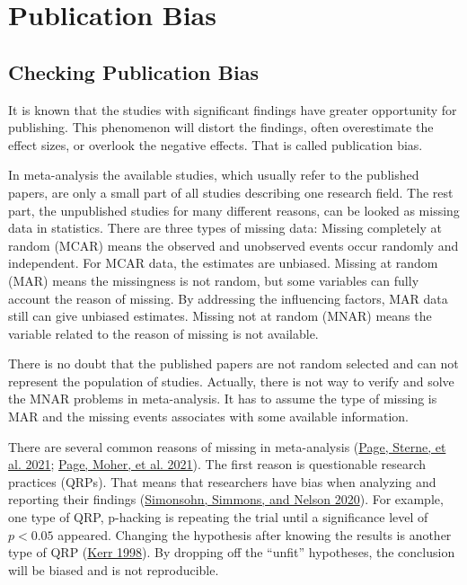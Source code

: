 \documentclass[
  11pt,
  openany]{memoir}
\begin{document}
\hypertarget{publication-bias}{%
\section{Publication Bias}\label{publication-bias}}

\hypertarget{checking-publication-bias}{%
\subsection{Checking Publication Bias}\label{checking-publication-bias}}

It is known that the studies with significant findings have greater opportunity for publishing.
This phenomenon will distort the findings, often overestimate the effect sizes, or overlook the negative effects.
That is called publication bias.

In meta-analysis the available studies, which usually refer to the published papers, are only a small part of all studies describing one research field.
The rest part, the unpublished studies for many different reasons, can be looked as missing data in statistics. There are three types of missing data:
Missing completely at random (MCAR) means the observed and unobserved events occur randomly and independent. For MCAR data, the estimates are unbiased.
Missing at random (MAR) means the missingness is not random, but some variables can fully account the reason of missing. By addressing the influencing factors, MAR data still can give unbiased estimates.
Missing not at random (MNAR) means the variable related to the reason of missing is not available.

There is no doubt that the published papers are not random selected and can not represent the population of studies.
Actually, there is not way to verify and solve the MNAR problems in meta-analysis.
It has to assume the type of missing is MAR and the missing events associates with some available information.

There are several common reasons of missing in meta-analysis (\protect\hyperlink{ref-pageInvestigatingDealingPublication2021}{Page, Sterne, et al. 2021}; \protect\hyperlink{ref-pagePRISMA2020Explanation2021}{Page, Moher, et al. 2021}).
The first reason is questionable research practices (QRPs). That means that researchers have bias when analyzing and reporting their findings (\protect\hyperlink{ref-simonsohnSpecificationCurveAnalysis2020}{Simonsohn, Simmons, and Nelson 2020}).
For example, one type of QRP, p-hacking is repeating the trial until a significance level of \(p<0.05\) appeared.
Changing the hypothesis after knowing the results is another type of QRP (\protect\hyperlink{ref-kerrHARKingHypothesizingResults1998}{Kerr 1998}). By dropping off the ``unfit'' hypotheses, the conclusion will be biased and is not reproducible.
\end{document}
